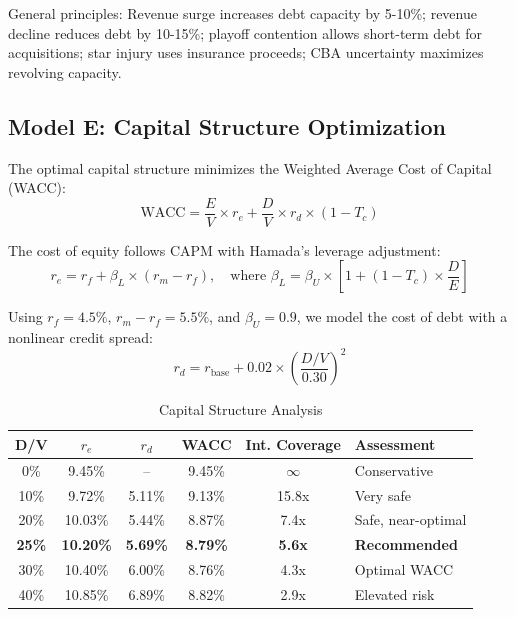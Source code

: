 \documentclass{mcmthesis}
\begin{document}
General principles: Revenue surge increases debt capacity by 5-10\%; revenue decline reduces debt by 10-15\%; playoff contention allows short-term debt for acquisitions; star injury uses insurance proceeds; CBA uncertainty maximizes revolving capacity.

\subsection{Model E: Capital Structure Optimization}

The optimal capital structure minimizes the Weighted Average Cost of Capital (WACC):
\begin{equation}
\text{WACC} = \frac{E}{V} \times r_e + \frac{D}{V} \times r_d \times (1 - T_c)
\end{equation}

The cost of equity follows CAPM with Hamada's leverage adjustment:
\begin{equation}
r_e = r_f + \beta_L \times (r_m - r_f), \quad \text{where } \beta_L = \beta_U \times \left[1 + (1-T_c) \times \frac{D}{E}\right]
\end{equation}

Using $r_f = 4.5\%$, $r_m - r_f = 5.5\%$, and $\beta_U = 0.9$, we model the cost of debt with a nonlinear credit spread:
\begin{equation}
r_d = r_{\text{base}} + 0.02 \times \left(\frac{D/V}{0.30}\right)^2
\end{equation}

\begin{table}[H]
\centering
\caption{Capital Structure Analysis}
\begin{tabular}{cccccl}
\toprule
\textbf{D/V} & \textbf{$r_e$} & \textbf{$r_d$} & \textbf{WACC} & \textbf{Int. Coverage} & \textbf{Assessment} \\
\midrule
0\% & 9.45\% & -- & 9.45\% & $\infty$ & Conservative \\
10\% & 9.72\% & 5.11\% & 9.13\% & 15.8x & Very safe \\
20\% & 10.03\% & 5.44\% & 8.87\% & 7.4x & Safe, near-optimal \\
\textbf{25\%} & \textbf{10.20\%} & \textbf{5.69\%} & \textbf{8.79\%} & \textbf{5.6x} & \textbf{Recommended} \\
30\% & 10.40\% & 6.00\% & 8.76\% & 4.3x & Optimal WACC \\
40\% & 10.85\% & 6.89\% & 8.82\% & 2.9x & Elevated risk \\
\bottomrule
\end{tabular}
\end{table}
\end{document}
